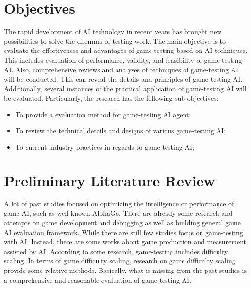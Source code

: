 \documentclass[11pt,en,number]{elegantpaper}
\newcommand{\upcite}[1]{\textsuperscript{\textsuperscript{\cite{#1}}}}
\begin{document}
\section{Objectives}
\noindent
The rapid development of AI technology in recent years has brought new possibilities to solve the dilemma of testing work. The main objective is to evaluate the effectiveness and advantages of game testing based on AI techniques. This includes evaluation of performance, validity, and feasibility of game-testing AI. Also, comprehensive reviews and analyses of techniques of game-testing AI will be conducted. This can reveal the details and principles of game-testing AI. Additionally, several instances of the practical application of game-testing AI will be evaluated. Particularly, the research has the following sub-objectives:
\begin{itemize}
    \item To provide a evaluation method for game-testing AI agent;
    \item To review the technical details and designs of various game-testing AI;
    \item To current industry practices in regards to game-testing AI;
\end{itemize}

\section{Preliminary Literature Review}
\noindent
A lot of past studies focused on optimizing the intelligence or performance of game AI, such as well-known AlphaGo\upcite{silver2017mastering}. There are already some research and attempts on game development and debugging\upcite{8477829} as well as building general game AI evaluation framework\upcite{perezliebana2018general}. While there are still few studies focus on game-testing with AI. Instead, there are some works about game production and measurement assisted by AI\upcite{6633663}. According to some research\upcite{tomai2014adapting}, game-testing includes difficulty scaling. In terms of game difficulty scaling, research on game difficulty scaling provide some \upcite{spronck2004difficulty} relative methods. 
Basically, what is missing from the past studies is a comprehensive and reasonable evaluation of game-testing AI.
\end{document}
